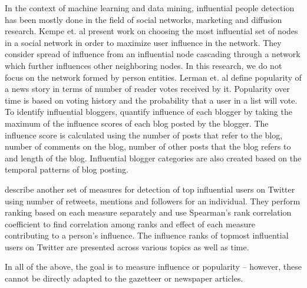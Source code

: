 In the context of machine learning and data mining, influential people detection has been mostly done in the field of social networks, marketing and diffusion research.
Kempe et. al \cite{kempe2003maximizing} present work on choosing the most influential set of nodes  in a social network in order to maximize user influence in the network. They consider spread of influence from an influential node cascading through a network which further influences other neighboring nodes. In this research, we do not focus on the network formed by person entities. Lerman et. al \cite{lerman2010using} define popularity of a news story in terms of number of reader votes received by it. Popularity over time is based on voting history and the probability that a user in a list will vote. To identify influential bloggers, \cite{agarwal2008identifying} quantify influence of each blogger by taking the maximum of the influence scores of each blog posted by the blogger. The influence score is calculated using the number of posts that refer to the blog, number of comments on the blog, number of other posts that the blog refers to and length of the blog. Influential blogger categories are also created based on the temporal patterns of blog posting. 

\cite{cha2010measuring} describe another set of measures for detection of top influential users on Twitter using number of retweets, mentions and followers for an individual. They perform ranking based on each measure separately and use Spearman's rank correlation coefficient to find correlation among ranks and effect of each measure contributing to a person's influence. The influence ranks of topmost influential users on Twitter are presented across various topics as well as time.

In all of the above, the goal is to measure influence or popularity -- however, these cannot be directly adapted to the gazetteer or newspaper articles. 
